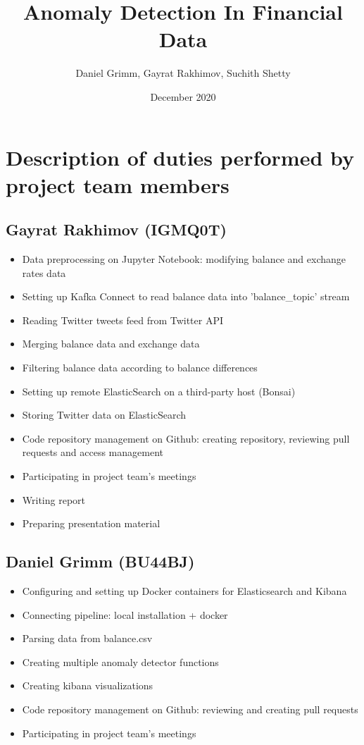 \documentclass{article}
\title{Anomaly Detection In Financial Data}
\author{Daniel Grimm, Gayrat Rakhimov, Suchith Shetty}
\date{December 2020}
\begin{document}
\maketitle

\section{Description of duties performed by project team members}

\subsection{Gayrat Rakhimov (IGMQ0T)}
\begin{itemize}
    \item Data preprocessing on Jupyter Notebook: modifying balance and exchange rates data
    \item Setting up Kafka Connect to read balance data into 'balance\_topic' stream
    \item Reading Twitter tweets feed from Twitter API
    \item Merging balance data and exchange data
    \item Filtering balance data according to balance differences
    \item Setting up remote ElasticSearch on a third-party host (Bonsai)
    \item Storing Twitter data on ElasticSearch
    \item Code repository management on Github: creating repository, reviewing pull requests and access management
    \item Participating in project team's meetings
    \item Writing report
    \item Preparing presentation material
\end{itemize}

\subsection{Daniel Grimm (BU44BJ)}
\begin{itemize}
    \item Configuring and setting up Docker containers for Elasticsearch and Kibana
    \item Connecting pipeline: local installation + docker
    \item Parsing data from balance.csv
    \item Creating multiple anomaly detector functions
    \item Creating kibana visualizations
    \item Code  repository  management  on  Github: reviewing and creating pull requests
    \item Participating in project team’s meetings
\end{itemize}
\end{document}
